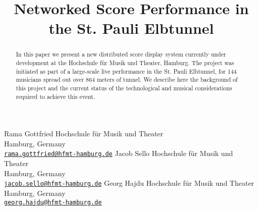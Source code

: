 

\def\papertitle{Networked Score Performance in the St. Pauli Elbtunnel}
\def\firstauthor{Rama Gottfried}
\def\secondauthor{Jacob Sello}
\def\thirdauthor{Georg Hajdu}

\def\Hochschule{ Hochschule f\"ur Musik und Theater}

\title{\papertitle}
 \threeauthors
   {\firstauthor} {	
      Hochschule f\"ur Musik und Theater\\
         Hamburg, Germany \\ %
   \small{\tt \href{mailto:rama.gottfried@hfmt-hamburg.de}{rama.gottfried@hfmt-hamburg.de}}}
    {\secondauthor} {
   Hochschule f\"ur Musik und Theater\\
   Hamburg, Germany \\ %
   \small{\tt \href{mailto:jacob.sello@hfmt-hamburg.de}{jacob.sello@hfmt-hamburg.de}}}
   {\thirdauthor} {
   Hochschule f\"ur Musik und Theater\\
   Hamburg, Germany \\ %
   \small{\tt \href{mailto:georg.hajdu@hfmt-hamburg.de}{georg.hajdu@hfmt-hamburg.de}}}




%

\capstartfalse
\maketitle
\capstarttrue
%
\begin{abstract}
In this paper we present a new distributed score display system currently under development at the Hochschule f\"ur Musik und Theater, Hamburg.
The project was initiated as part of a large-scale live performance in the St. Pauli Elbtunnel, for 144 musicians spread out over 864 meters of tunnel.
We describe here the background of this project and the current status of the technological and musical considerations required to achieve this event.

\end{abstract}



